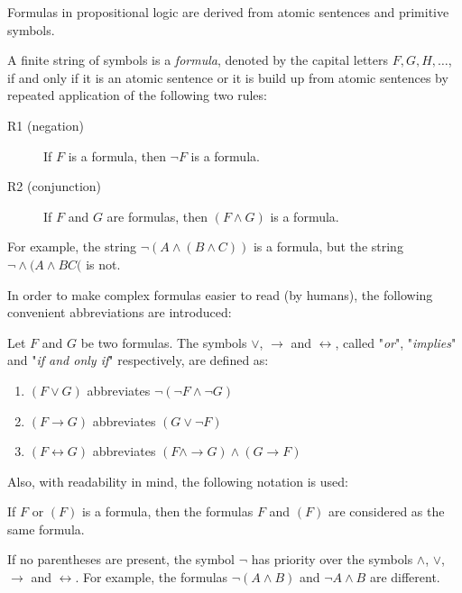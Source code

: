 Formulas in propositional logic are derived from atomic sentences and primitive symbols.

\begin{definition}
\label{definition:logic_formula}
A finite string of symbols is a \emph{formula}, denoted by the capital letters $F, G, H, \ldots$, if and only if it is an atomic sentence or it is build up from atomic sentences by repeated application of the following two rules:
\begin{description}
\item[R1 (negation)] If $F$ is a formula, then $\lnot F$ is a formula.
\item[R2 (conjunction)] If $F$ and $G$ are formulas, then $( F \land G )$ is a formula.
\end{description}
\end{definition}

For example, the string $\lnot ( A \land (B \land C) )$ is a formula, but the string $ \lnot \land ( A \land B C ($ is not.

In order to make complex formulas easier to read (by humans), the following convenient abbreviations are introduced:

\begin{definition}
Let $F$ and $G$ be two formulas. The symbols $\lor$, $\rightarrow$ and $\leftrightarrow$, called "\emph{or}", "\emph{implies}" and "\emph{if and only if}" respectively, are defined as:
\begin{enumerate}[label=(\roman*)]
\item $\left( F \lor G \right)$ abbreviates $ \lnot \left( \lnot F \land \lnot G \right)$
\item $\left( F \rightarrow G \right)$ abbreviates $\left( G \lor \lnot F \right)$
\item $\left( F \leftrightarrow G \right)$ abbreviates $ \left( F \land \rightarrow G \right) \land \left( G \rightarrow F \right)$
\end{enumerate}
\end{definition}

Also, with readability in mind, the following notation is used:

\begin{notation}
If $F$ or $\left( F \right)$ is a formula, then the formulas $F$ and $\left( F \right)$ are considered as the same formula.
\end{notation}

If no parentheses are present, the symbol $\lnot$ has priority over the symbols $\land$, $\lor$, $\rightarrow$ and $\leftrightarrow$. For example, the formulas $\lnot ( A \land B )$ and $\lnot A \land B$ are different.

